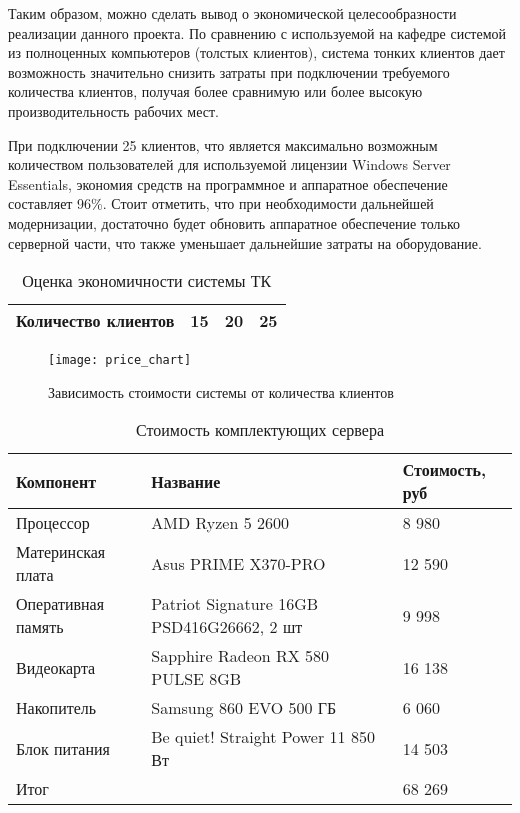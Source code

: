 Таким образом, можно сделать вывод о экономической целесообразности реализации данного
проекта. По сравнению с используемой на кафедре системой из полноценных компьютеров
(толстых клиентов), система тонких клиентов дает возможность значительно снизить затраты
при подключении требуемого количества клиентов, получая более сравнимую или более
высокую производительность рабочих мест. 

При подключении 25 клиентов, что является максимально возможным
количеством пользователей для используемой лицензии Windows Server Essentials, экономия
средств на программное и аппаратное обеспечение составляет 96\%.
Стоит отметить, что при необходимости дальнейшей модернизации, достаточно будет обновить
аппаратное обеспечение только серверной части, что также уменьшает дальнейшие затраты на
оборудование.

\begin{table}[h]
    \centering
    \caption{Оценка экономичности системы ТК}
    \label{tab:price_comp}
    \begin{tabu}to \linewidth{X[2,l]X[1,c,m]X[1,c,m]X[1,c,m]}
        \toprule
        Количество клиентов & 15 & 20 & 25 \\
        \midrule
        
        \bottomrule
    \end{tabu}
\end{table}

\begin{figure}[h]
    \center
    \texttt{[image: price\_chart]}
    \caption{Зависимость стоимости системы от количества клиентов}
    \label{pic:price_chart}
\end{figure}

\begin{table}[b]
    \centering
    \caption{Стоимость комплектующих сервера}
    \label{tab:server_price}
    \begin{tabu}to \linewidth{XX[2,c,m]X[r,m]}
        \toprule
        Компонент & Название & Стоимость, руб \\
        \midrule
        Процессор          & AMD Ryzen 5 2600                          & 8 980  \\
        Материнская плата  & Asus PRIME X370-PRO                       & 12 590 \\
        Оперативная память & Patriot Signature 16GB PSD416G26662, 2 шт & 9 998   \\
        Видеокарта         & Sapphire Radeon RX 580 PULSE 8GB          & 16 138  \\
        Накопитель         & Samsung 860 EVO 500 ГБ                    & 6 060  \\
        Блок питания       & Be quiet! Straight Power 11 850 Вт        & 14 503 \\
        \midrule
        Итог & & 68 269 \\
        \bottomrule
    \end{tabu}
\end{table}

